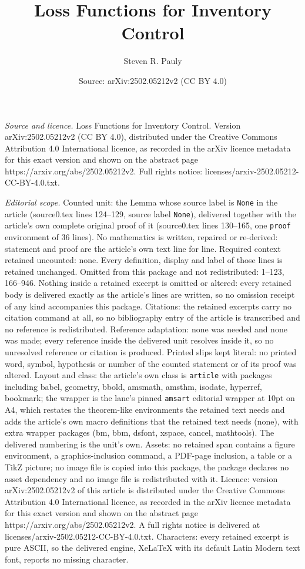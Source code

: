 \documentclass[10pt,a4paper]{amsart}
\title[Loss Functions for Inventory Control]{Loss Functions for Inventory Control}
\author{Steven R. Pauly}
\date{Source: arXiv:2502.05212v2 (CC BY 4.0)}
\begin{document}
\maketitle

\noindent\emph{Source and licence.} Loss Functions for Inventory Control. Version arXiv:2502.05212v2 (CC BY 4.0), distributed under the Creative Commons Attribution 4.0 International licence, as recorded in the arXiv licence metadata for this exact version and shown on the abstract page https://arxiv.org/abs/2502.05212v2. Full rights notice: licenses/arxiv-2502.05212-CC-BY-4.0.txt.\par\smallskip

\noindent\textit{Editorial scope.} Counted unit: the Lemma whose source label is \texttt{None} in the article (source0.tex lines 124--129, source label \texttt{None}), delivered together with the article's own complete original proof of it (source0.tex lines 130--165, one \texttt{proof} environment of 36 lines). No mathematics is written, repaired or re-derived: statement and proof are the article's own text line for line. Required context retained uncounted: none. Every definition, display and label of those lines is retained unchanged. Omitted from this package and not redistributed: 1--123, 166--946. Nothing inside a retained excerpt is omitted or altered: every retained body is delivered exactly as the article's lines are written, so no omission receipt of any kind accompanies this package. Citations: the retained excerpts carry no citation command at all, so no bibliography entry of the article is transcribed and no reference is redistributed. Reference adaptation: none was needed and none was made; every reference inside the delivered unit resolves inside it, so no unresolved reference or citation is produced. Printed slips kept literal: no printed word, symbol, hypothesis or number of the counted statement or of its proof was altered. Layout and class: the article's own class is \texttt{article} with packages including babel, geometry, bbold, amsmath, amsthm, isodate, hyperref, bookmark; the wrapper is the lane's pinned \texttt{amsart} editorial wrapper at 10pt on A4, which restates the theorem-like environments the retained text needs and adds the article's own macro definitions that the retained text needs (none), with extra wrapper packages (bm, bbm, dsfont, xspace, cancel, mathtools). The delivered numbering is the unit's own. Assets: no retained span contains a figure environment, a graphics-inclusion command, a PDF-page inclusion, a table or a TikZ picture; no image file is copied into this package, the package declares no asset dependency and no image file is redistributed with it. Licence: version arXiv:2502.05212v2 of this article is distributed under the Creative Commons Attribution 4.0 International licence, as recorded in the arXiv licence metadata for this exact version and shown on the abstract page https://arxiv.org/abs/2502.05212v2. A full rights notice is delivered at licenses/arxiv-2502.05212-CC-BY-4.0.txt. Characters: every retained excerpt is pure ASCII, so the delivered engine, XeLaTeX with its default Latin Modern text font, reports no missing character.
\end{document}
